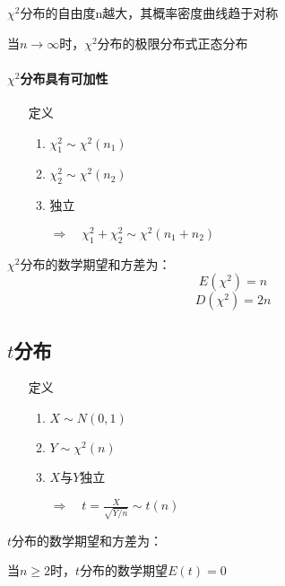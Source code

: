 \documentclass[UTF8,10pt]{book}
\begin{document}
            {\kaishu $\chi^2$分布的自由度n越大，其概率密度曲线趋于对称}

            {\kaishu 当$n\to \infty $时，$\chi^2$分布的极限分布式正态分布}

            \paragraph{$\chi^2$分布具有可加性}  
            \begin{itemize}
                \item [定义] {
                    \begin{enumerate}
                        \item $\chi_1^2 \sim \chi^2(n_1)$
                        \item $\chi_2^2 \sim \chi^2(n_2)$
                        \item 独立
                       
                        $\Rightarrow \quad \chi_1^2 + \chi_2^2 \sim \chi^2(n_1 + n_2)$ 
                    \end{enumerate}
                }
            \end{itemize}

            $\chi^2$分布的数学期望和方差为：
            $$E(\chi^2) = n $$
            $$D(\chi^2) = 2n $$

        \subsection{$t$分布}

            \begin{itemize}
                \item [定义] {
                    \begin{enumerate}
                        \item $X \sim N(0,1)$
                        \item $Y \sim \chi^2(n)$
                        \item $X$与$Y$独立
                        
                        $\Rightarrow \quad t = \frac{X}{\sqrt{Y/n}} \sim t(n)$ 
                    \end{enumerate}
                }
            \end{itemize}

            $t$分布的数学期望和方差为：

            {\kaishu 当$n \ge 2$时，$t$分布的数学期望$E(t)=0$}
\end{document}
